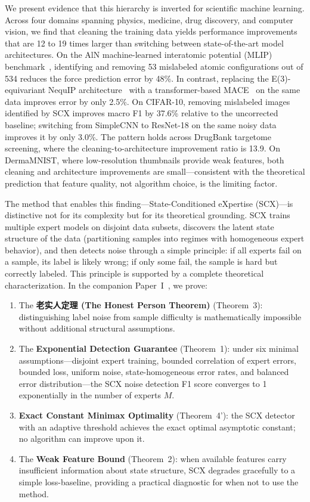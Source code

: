 \documentclass[12pt,a4paper]{article}
\begin{document}
We present evidence that this hierarchy is inverted for scientific machine learning. Across four domains spanning physics, medicine, drug discovery, and computer vision, we find that cleaning the training data yields performance improvements that are 12 to 19 times larger than switching between state-of-the-art model architectures. On the AlN machine-learned interatomic potential (MLIP) benchmark~\cite{shapeev2016moment}, identifying and removing 53 mislabeled atomic configurations out of 534 reduces the force prediction error by 48\%. In contrast, replacing the E(3)-equivariant NequIP architecture~\cite{batzner2022e3nn} with a transformer-based MACE~\cite{batatia2022mace} on the same data improves error by only 2.5\%. On CIFAR-10, removing mislabeled images identified by SCX improves macro F1 by 37.6\% relative to the uncorrected baseline; switching from SimpleCNN to ResNet-18 on the same noisy data improves it by only 3.0\%. The pattern holds across DrugBank targetome screening, where the cleaning-to-architecture improvement ratio is 13.9. On DermaMNIST, where low-resolution thumbnails provide weak features, both cleaning and architecture improvements are small---consistent with the theoretical prediction that feature quality, not algorithm choice, is the limiting factor.

The method that enables this finding---State-Conditioned eXpertise (SCX)---is distinctive not for its complexity but for its theoretical grounding. SCX trains multiple expert models on disjoint data subsets, discovers the latent state structure of the data (partitioning samples into regimes with homogeneous expert behavior), and then detects noise through a simple principle: if all experts fail on a sample, its label is likely wrong; if only some fail, the sample is hard but correctly labeled. This principle is supported by a complete theoretical characterization. In the companion Paper~I~\cite{xi2025fundamental}, we prove:

\begin{enumerate}
    \item The \textbf{老实人定理 (The Honest Person Theorem)} (Theorem~3): distinguishing label noise from sample difficulty is mathematically impossible without additional structural assumptions.
    \item The \textbf{Exponential Detection Guarantee} (Theorem~1): under six minimal assumptions---disjoint expert training, bounded correlation of expert errors, bounded loss, uniform noise, state-homogeneous error rates, and balanced error distribution---the SCX noise detection F1 score converges to 1 exponentially in the number of experts $M$.
    \item \textbf{Exact Constant Minimax Optimality} (Theorem~4'): the SCX detector with an adaptive threshold achieves the exact optimal asymptotic constant; no algorithm can improve upon it.
    \item The \textbf{Weak Feature Bound} (Theorem~2): when available features carry insufficient information about state structure, SCX degrades gracefully to a simple loss-baseline, providing a practical diagnostic for when not to use the method.
\end{enumerate}
\end{document}
